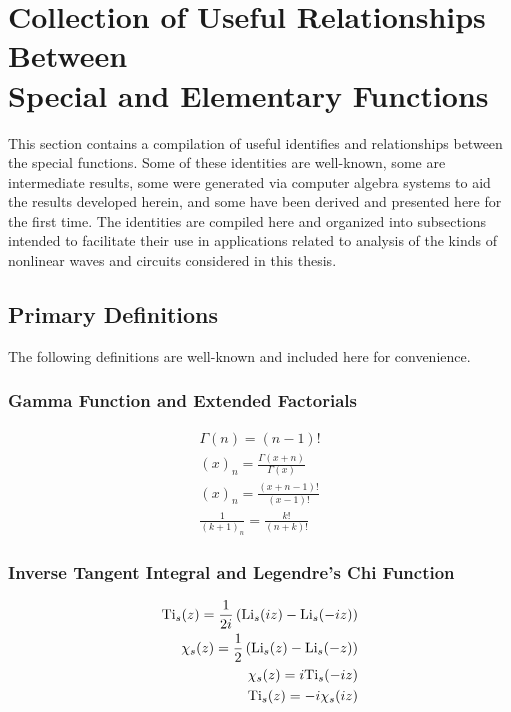 \section[Useful Special Function Relations]{Collection of Useful Relationships Between\\Special and Elementary Functions}

This section contains a compilation of useful identifies and relationships between the special functions.  Some of these identities are well-known, some are intermediate results, some were generated via computer algebra systems to aid the results developed herein, and some have been derived and presented here for the first time.  The identities are compiled here and organized into subsections intended to facilitate their use in applications related to analysis of the kinds of nonlinear waves and circuits considered in this thesis.

\subsection{Primary Definitions}

The following definitions are well-known and included here for convenience.
\subsubsection{Gamma Function and Extended Factorials}
\begin{align}
	\Gamma(n) = (n-1)! \\
	(x)_n = \frac{\Gamma(x+n)}{\Gamma(x)}\\
	(x)_n = \frac{(x+n-1)!}{(x-1)!} \\
	\frac{1}{(k+1)_n} = \frac{k!}{(n+k)!}
\end{align}

\subsubsection{Inverse Tangent Integral and Legendre's Chi Function}
\begin{align}
	\mathrm{Ti}_s(z) = 
	\frac{1}{2i}\left( \operatorname{Li}_s(i z) - \operatorname{Li}_s(-i z) \right) \\
	\chi_s(z) =
	\frac{1}{2}\left(\operatorname{Li}_s(z) - \operatorname{Li}_s(-z)\right) \\
	\chi_s(z) = i\mathrm{Ti}_s(-iz) \\
	\mathrm{Ti}_s(z) = -i\chi_s(iz)
\end{align}

